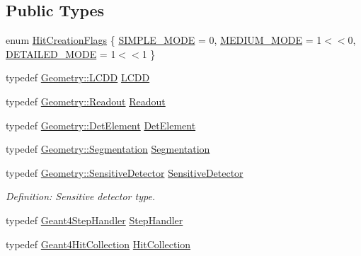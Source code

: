 \subsection*{Public Types}
\begin{DoxyCompactItemize}
\item 
enum \hyperlink{class_d_d4hep_1_1_simulation_1_1_geant4_sensitive_a496cf61e393c9c2f096f60a4ee20c750}{Hit\+Creation\+Flags} \{ \hyperlink{class_d_d4hep_1_1_simulation_1_1_geant4_sensitive_a496cf61e393c9c2f096f60a4ee20c750affa871d1db60d0783987ac12ad64663f}{S\+I\+M\+P\+L\+E\+\_\+\+M\+O\+DE} = 0, 
\hyperlink{class_d_d4hep_1_1_simulation_1_1_geant4_sensitive_a496cf61e393c9c2f096f60a4ee20c750a7293a18844334c7e1ed078b7e593e4d9}{M\+E\+D\+I\+U\+M\+\_\+\+M\+O\+DE} = 1$<$$<$0, 
\hyperlink{class_d_d4hep_1_1_simulation_1_1_geant4_sensitive_a496cf61e393c9c2f096f60a4ee20c750a3327f21d3b9852572e79cca4b399628d}{D\+E\+T\+A\+I\+L\+E\+D\+\_\+\+M\+O\+DE} = 1$<$$<$1
 \}
\item 
typedef \hyperlink{class_d_d4hep_1_1_geometry_1_1_l_c_d_d}{Geometry\+::\+L\+C\+DD} \hyperlink{class_d_d4hep_1_1_simulation_1_1_geant4_sensitive_a3373caa6917867ca7c871df20fb467c8}{L\+C\+DD}
\item 
typedef \hyperlink{class_d_d4hep_1_1_geometry_1_1_readout}{Geometry\+::\+Readout} \hyperlink{class_d_d4hep_1_1_simulation_1_1_geant4_sensitive_a2dc0e9ab41aeebbb0bad179419eeac72}{Readout}
\item 
typedef \hyperlink{class_d_d4hep_1_1_geometry_1_1_det_element}{Geometry\+::\+Det\+Element} \hyperlink{class_d_d4hep_1_1_simulation_1_1_geant4_sensitive_a1cb1af5fb1194be1e1c1137f1e54272b}{Det\+Element}
\item 
typedef \hyperlink{class_d_d4hep_1_1_geometry_1_1_segmentation}{Geometry\+::\+Segmentation} \hyperlink{class_d_d4hep_1_1_simulation_1_1_geant4_sensitive_ac898770dc0c398f3b7b88d1bf5f72314}{Segmentation}
\item 
typedef \hyperlink{class_d_d4hep_1_1_geometry_1_1_sensitive_detector}{Geometry\+::\+Sensitive\+Detector} \hyperlink{class_d_d4hep_1_1_simulation_1_1_geant4_sensitive_a985a23f6592b3ab41b9aa45e47fbc9ea}{Sensitive\+Detector}
\begin{DoxyCompactList}\small\item\em Definition\+: Sensitive detector type. \end{DoxyCompactList}\item 
typedef \hyperlink{class_d_d4hep_1_1_simulation_1_1_geant4_step_handler}{Geant4\+Step\+Handler} \hyperlink{class_d_d4hep_1_1_simulation_1_1_geant4_sensitive_a6df3adaabfad8e56f08282f2cf70a9b7}{Step\+Handler}
\item 
typedef \hyperlink{class_d_d4hep_1_1_simulation_1_1_geant4_hit_collection}{Geant4\+Hit\+Collection} \hyperlink{class_d_d4hep_1_1_simulation_1_1_geant4_sensitive_a160ee45c4477c7165b1d56d377e5582f}{Hit\+Collection}
\end{DoxyCompactItemize}

